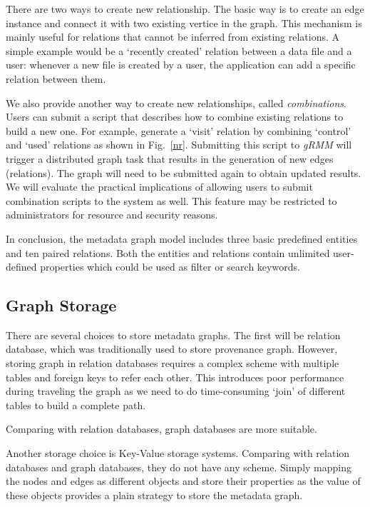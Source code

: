 There are two ways to create new relationship. The basic
way is to create an edge instance and connect it with
two existing vertice in the graph. This mechanism is mainly 
useful for relations that
cannot be inferred from existing relations. A simple example would be a
`recently created' relation between a data file and a user: whenever
a new file is created by a user, the application can add a specific
relation between them.

We also provide another way to create new relationships, called
\textit{combinations}. Users can submit a script that describes
how to combine existing relations to build a new one. For example,
generate a `visit' relation by combining `control' and `used'
relations as shown in Fig.~\ref{nr}. Submitting this script to 
\textit{gRMM} will trigger a distributed graph
task that results in the generation of new edges (relations).  The graph
will need to be submitted again to obtain updated results.
We will evaluate the practical implications of allowing users to submit
combination scripts to the system as well.  This feature may be restricted
to administrators for resource and security reasons.

In conclusion, the metadata graph model includes three basic predefined
entities and ten paired relations. Both the entities and relations contain unlimited user-defined properties which could be used as filter or search keywords.




\subsection{Graph Storage}

There are several choices to store metadata graphs. The first will be relation database, which was traditionally used to store provenance graph. However, storing graph in relation databases requires a complex scheme with multiple tables and foreign keys to refer each other. This introduces poor performance during traveling the graph as we need to do time-consuming `join' of different tables to build a complete path.

Comparing with relation databases, graph databases are more suitable. 

Another storage choice is Key-Value storage systems. Comparing with relation databases and graph databases, they do not have any scheme. Simply mapping the nodes and edges as different objects and store their properties as the value of these objects provides a plain strategy to store the metadata graph. 

